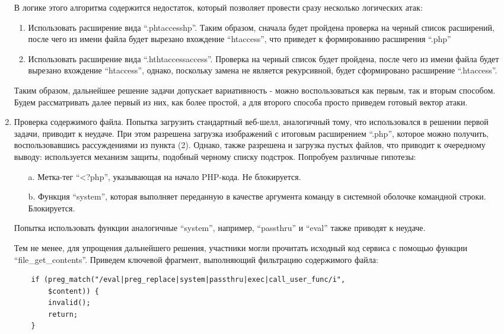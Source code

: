 \begin{enumerate}
    В логике этого алгоритма содержится недостаток, который позволяет провести сразу несколько логических атак:
    \begin{enumerate}
        \item Использовать расширение вида “.phtaccesshp”. Таким образом, сначала будет пройдена проверка на черный список расширений, после чего из имени файла будет вырезано вхождение “htaccess”, что приведет к формированию расширения “.php”
        \item Использовать расширение вида “.hthtaccessaccess”. Проверка на черный список будет пройдена, после чего из имени файла будет вырезано вхождение “htaccess”, однако, поскольку замена не является рекурсивной, будет сформировано расширение “.htaccess”.
    \end{enumerate}

    Таким образом, дальнейшее решение задачи допускает вариативность - можно воспользоваться как первым, так и вторым способом. Будем рассматривать далее первый из них, как более простой, а для второго способа просто приведем готовый вектор атаки.
    \item Проверка содержимого файла. Попытка загрузить стандартный веб-шелл, аналогичный тому, что использовался в решении первой задачи, приводит к неудаче. При этом разрешена загрузка изображений с итоговым расширением “.php”, которое можно получить, воспользовавшись рассуждениями из пункта (2). Однако, также разрешена и загрузка пустых файлов, что приводит к очередному выводу: используется механизм защиты, подобный черному списку подстрок. Попробуем различные гипотезы:
    \begin{enumerate}
        \item[a.] Метка-тег “<?php”, указывающая на начало PHP-кода. Не блокируется.
        \item[b.] Функция “system”, которая выполняет переданную в качестве аргумента команду в системной оболочке командной строки. Блокируется.
    \end{enumerate}
    
    Попытка использовать функции аналогичные “system”, например, “passthru” и “eval” также приводят к неудаче.

    Тем не менее, для упрощения дальнейшего решения, участники могли прочитать исходный код сервиса с помощью функции “file\_get\_contents”. Приведем ключевой фрагмент, выполняющий фильтрацию содержимого файла:

    \begin{verbatim}
    if (preg_match("/eval|preg_replace|system|passthru|exec|call_user_func/i", 
        $content)) {
        invalid();
        return;
    }    
    \end{verbatim}


\end{enumerate}
